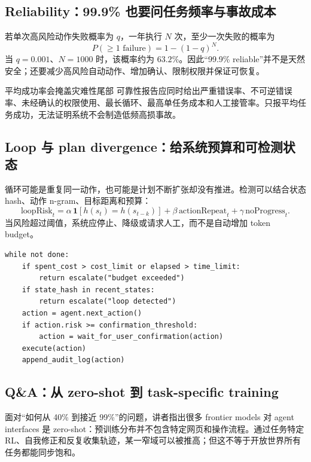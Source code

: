 \documentclass[a4paper]{article}
\begin{document}
\subsection{Reliability：99.9\% 也要问任务频率与事故成本}

若单次高风险动作失败概率为 $q$，一年执行 $N$ 次，至少一次失败的概率为
\[
P(\ge 1\text{ failure})=1-(1-q)^N.
\]
当 $q=0.001$、$N=1000$ 时，该概率约为 $63.2\%$。因此“99.9\% reliable”并不是天然安全；还要减少高风险自动动作、增加确认、限制权限并保证可恢复。


\begin{warningbox}{平均成功率会掩盖灾难性尾部}
可靠性报告应同时给出严重错误率、不可逆错误率、未经确认的权限使用、最长循环、最高单任务成本和人工接管率。只报平均任务成功，无法证明系统不会制造低频高损事故。
\end{warningbox}

\subsection{Loop 与 plan divergence：给系统预算和可检测状态}

循环可能是重复同一动作，也可能是计划不断扩张却没有推进。检测可以结合状态 hash、动作 n-gram、目标距离和预算：
\[
\text{loopRisk}_t=
\alpha\,\mathbf{1}[h(s_t)=h(s_{t-k})]
+\beta\,\text{actionRepeat}_t
+\gamma\,\text{noProgress}_t.
\]
当风险超过阈值，系统应停止、降级或请求人工，而不是自动增加 token budget。

\begin{lstlisting}[caption={带预算、重复检测与人工接管的执行循环}]
while not done:
    if spent_cost > cost_limit or elapsed > time_limit:
        return escalate("budget exceeded")
    if state_hash in recent_states:
        return escalate("loop detected")
    action = agent.next_action()
    if action.risk >= confirmation_threshold:
        action = wait_for_user_confirmation(action)
    execute(action)
    append_audit_log(action)
\end{lstlisting}

\subsection{Q\&A：从 zero-shot 到 task-specific training}

面对“如何从 40\% 到接近 99\%”的问题，讲者指出很多 frontier models 对 agent interfaces 是 zero-shot：预训练分布并不包含特定网页和操作流程。通过任务特定 RL、自我修正和反复收集轨迹，某一窄域可以被推高；但这不等于开放世界所有任务都能同步饱和。
\end{document}
